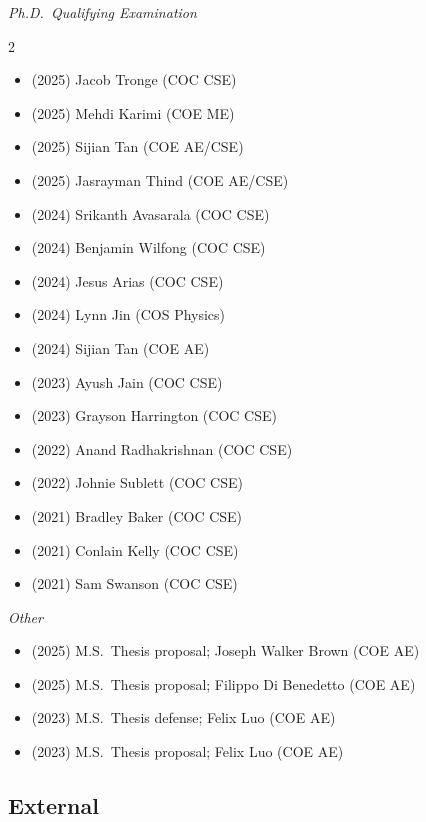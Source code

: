 \textit{Ph.D.\ Qualifying Examination}
\vspace{-0.25cm}
\begin{multicols}{2}
\begin{itemize}
    \item (2025) Jacob Tronge (COC CSE)
    \item (2025) Mehdi Karimi (COE ME)
    \item (2025) Sijian Tan (COE AE/CSE)
    \item (2025) Jasrayman Thind (COE AE/CSE)
    \item (2024) Srikanth Avasarala (COC CSE)
    \item (2024) Benjamin Wilfong (COC CSE)
    \item (2024) Jesus Arias (COC CSE)
    \item (2024) Lynn Jin (COS Physics)
    \item (2024) Sijian Tan (COE AE)
    \item (2023) Ayush Jain (COC CSE)
    \item (2023) Grayson Harrington (COC CSE)
    \item (2022) Anand Radhakrishnan (COC CSE)
    \item (2022) Johnie Sublett (COC CSE)
    \item (2021) Bradley Baker (COC CSE)
    \item (2021) Conlain Kelly (COC CSE)
    \item (2021) Sam Swanson (COC CSE)
\end{itemize}
\end{multicols}

\textit{Other}
\vspace{-0.1cm}
\begin{itemize}
    \item (2025) M.S.\  Thesis proposal; Joseph Walker Brown  (COE AE)
    \item (2025) M.S.\  Thesis proposal; Filippo Di Benedetto  (COE AE)
    \item (2023) M.S.\  Thesis defense;  Felix Luo (COE AE)
    \item (2023) M.S.\  Thesis proposal; Felix Luo (COE AE)
\end{itemize}

\subsection{External}

